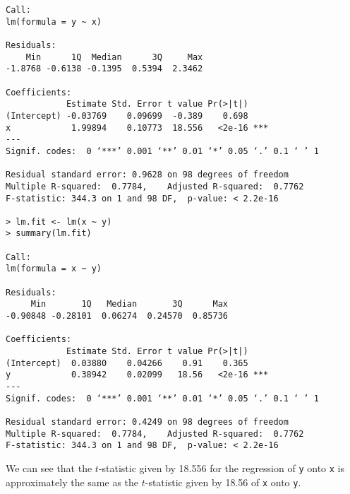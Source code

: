 \begin{itemize}
\begin{verbatim}
Call:
lm(formula = y ~ x)

Residuals:
    Min      1Q  Median      3Q     Max 
-1.8768 -0.6138 -0.1395  0.5394  2.3462 

Coefficients:
            Estimate Std. Error t value Pr(>|t|)    
(Intercept) -0.03769    0.09699  -0.389    0.698    
x            1.99894    0.10773  18.556   <2e-16 ***
---
Signif. codes:  0 ‘***’ 0.001 ‘**’ 0.01 ‘*’ 0.05 ‘.’ 0.1 ‘ ’ 1

Residual standard error: 0.9628 on 98 degrees of freedom
Multiple R-squared:  0.7784,    Adjusted R-squared:  0.7762 
F-statistic: 344.3 on 1 and 98 DF,  p-value: < 2.2e-16

> lm.fit <- lm(x ~ y)
> summary(lm.fit)

Call:
lm(formula = x ~ y)

Residuals:
     Min       1Q   Median       3Q      Max 
-0.90848 -0.28101  0.06274  0.24570  0.85736 

Coefficients:
            Estimate Std. Error t value Pr(>|t|)    
(Intercept)  0.03880    0.04266    0.91    0.365    
y            0.38942    0.02099   18.56   <2e-16 ***
---
Signif. codes:  0 ‘***’ 0.001 ‘**’ 0.01 ‘*’ 0.05 ‘.’ 0.1 ‘ ’ 1

Residual standard error: 0.4249 on 98 degrees of freedom
Multiple R-squared:  0.7784,    Adjusted R-squared:  0.7762 
F-statistic: 344.3 on 1 and 98 DF,  p-value: < 2.2e-16
        \end{verbatim}\normalsize
        We can see that the $t$-statistic given by 18.556 for the regression of \verb|y| 
        onto \verb|x| is approximately the same as the $t$-statistic given by 18.56 of 
        \verb|x| onto \verb|y|.
\end{itemize}
